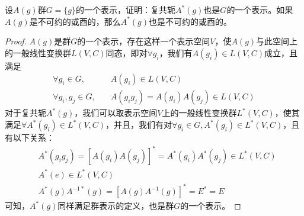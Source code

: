 \begin{problemset}[习题]
\item 设$A(g)$群$G=\{g\}$的一个表示，证明：复共轭$A^{*}(g)$也是$G$的一个表示。如果$A(g)$是不可约的或酉的，那么$A^*(g)$也是不可约的或酉的。
	\begin{proof}
		$A(g)$是群$G$的一个表示，存在这样一个表示空间$V$，使$A(g)$与此空间上的一般线性变换群$L(V,C)$同态，即对$\forall g_i$，我们有$A(g_i) \in L(V, C)$成立，且满足
		\begin{equation*}
			\begin{aligned}
				\forall g_{i} \in G, \quad & A(g_i) \in L(V, C)	\\
				\forall g_{i}, g_{j} \in G, \quad & A(g_i g_j) = A(g_i) A(g_j) \in L(V, C)
			\end{aligned}
		\end{equation*}
		对于复共轭$A^*(g)$，我们可以取表示空间$V$上的一般线性变换群$L^* (V, C)$，使其满足$\forall A^* (g_i) \in L^* (V, C)$，并且，我们有对$\forall g_i \in G, A^*(g_i) \in L^*(V, C)$，且有以下关系：
		\begin{equation*}
			\begin{aligned}
				& A^* (g_i g_j) = [A(g_i) A(g_j)]^* = A^*(g_i) A^*(g_j) \in L^* (V, C)	\\
				& A^{*}(e) \in L^{*}(V, C) \\
				& A^{*}(g) A^{-1*}(g) = [A(g)A^{-1}(g)]^* = E^* = E
			\end{aligned}
		\end{equation*} 
		可知，$A^{*}(g)$同样满足群表示的定义，也是群$G$的一个表示。
	\end{proof}
\end{problemset}

